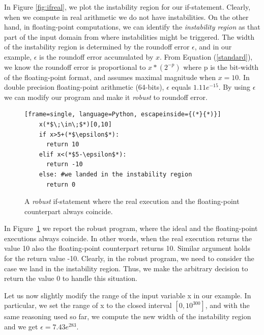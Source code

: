 In Figure \ref{fig:ifreal}, we plot the instability region for our if-statement. Clearly, when we compute in real arithmetic we do not have instabilities. On the other hand, in floating-point computations, we can identify the \emph{instability region} as that part of the input domain from where instabilities might be triggered.
%
The width of the instability region is determined by the roundoff error $\epsilon$, and in our example, $\epsilon$ is the roundoff error accumulated by $x$. From Equation (\ref{standard}), we know the roundoff error is proportional to $x*(2^{-p})$ where p is the bit-width of the floating-point format, and assumes maximal magnitude when $x=10$.  
%
In double precision floating-point arithmetic (64-bits), $\epsilon$ equals $1.11e^{-15}$.
%
By using $\epsilon$ we can modify our program and make it \emph{robust} to roundoff error.
%
\begin{figure}[tb!]
	\begin{lstlisting}[frame=single, language=Python, escapeinside={(*}{*)}]
	x(*$\;\in\;$*)[0,10]
	if x>5+(*$\epsilon$*):
	  return 10
	elif x<(*$5-\epsilon$*):
	  return -10
	else: #we landed in the instability region
	  return 0
	\end{lstlisting}
	\caption{A \emph{robust} if-statement where the real execution and the floating-point counterpart always coincide.}\label{fig:ifrobust}
\end{figure}
%

In Figure~\ref{fig:ifrobust} we report the robust program, where the ideal and the floating-point executions always coincide. 
%
In other words, when the real execution returns the value 10 also the floating-point counterpart returns 10. Similar argument holds for the return value -10.
%
Clearly, in the robust program, we need to consider the case we land in the instability region. Thus, we make the arbitrary decision to return the value $0$ to handle this situation.

%

Let us now slightly modify the range of the input variable x in our example. 
%
In particular, we set the range of x to the closed interval $[0, 10^{300}]$, and with the same reasoning used so far, we compute the new width of the instability region and we get $\epsilon=7.43e^{283}$.
%

